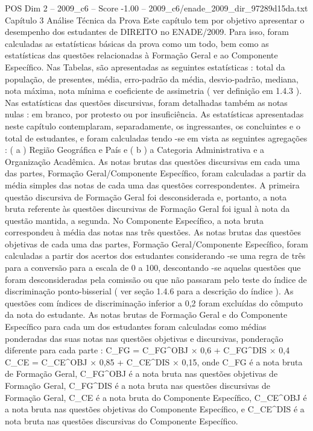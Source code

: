 \begin{textsample}{POS Dim 2 – 2009\_c6 – Score -1.00 – 2009\_c6/enade\_2009\_dir\_97289d15da.txt}  \label{ex:f2_pos_300}
Capítulo 3 Análise Técnica da Prova Este capítulo tem por objetivo apresentar o desempenho dos estudantes de DIREITO no ENADE/2009.
Para isso, foram calculadas as estatísticas básicas da prova como um todo, bem como as estatísticas das questões relacionadas à Formação Geral e ao Componente Específico.
Nas Tabelas, são apresentadas as seguintes estatísticas : total da população, de presentes, média, erro-padrão da média, desvio-padrão, mediana, nota máxima, nota mínima e coeficiente de assimetria ( ver definição em 1.4.3 ).
Nas estatísticas das questões discursivas, foram detalhadas também as notas nulas : em branco, por protesto ou por insuficiência.
As estatísticas apresentadas neste capítulo contemplaram, separadamente, os ingressantes, os concluintes e o total de estudantes, e foram calculadas tendo -se em vista as seguintes agregações : ( a ) Região Geográfica e País e ( b ) a Categoria Administrativa e a Organização Acadêmica.
As notas brutas das questões discursivas em cada uma das partes, Formação Geral/Componente Específico, foram calculadas a partir da média simples das notas de cada uma das questões correspondentes.
A primeira questão discursiva de Formação Geral foi desconsiderada e, portanto, a nota bruta referente às questões discursivas de Formação Geral foi igual à nota da questão mantida, a segunda.
No Componente Específico, a nota bruta correspondeu à média das notas nas três questões.
As notas brutas das questões objetivas de cada uma das partes, Formação Geral/Componente Específico, foram calculadas a partir dos acertos dos estudantes considerando -se uma regra de três para a conversão para a escala de 0 a 100, descontando -se aquelas questões que foram desconsideradas pela comissão ou que não passaram pelo teste do índice de discriminação ponto-bisserial ( ver seção 1.4.6 para a descrição do índice ).
As questões com índices de discriminação inferior a 0,2 foram excluídas do cômputo da nota do estudante.
As notas brutas de Formação Geral e do Componente Específico para cada um dos estudantes foram calculadas como médias ponderadas das suas notas nas questões objetivas e discursivas, ponderação diferente para cada parte : C\_FG = C\_FG\textasciicircum{}OBJ × 0,6 + C\_FG\textasciicircum{}DIS × 0,4 C\_CE = C\_CE\textasciicircum{}OBJ × 0,85 + C\_CE\textasciicircum{}DIS × 0,15, onde C\_FG é a nota bruta de Formação Geral, C\_FG\textasciicircum{}OBJ é a nota bruta nas questões objetivas de Formação Geral, C\_FG\textasciicircum{}DIS é a nota bruta nas questões discursivas de Formação Geral, C\_CE é a nota bruta do Componente Específico, C\_CE\textasciicircum{}OBJ é a nota bruta nas questões objetivas do Componente Específico, e C\_CE\textasciicircum{}DIS é a nota bruta nas questões discursivas do Componente Específico.

\end{textsample}
